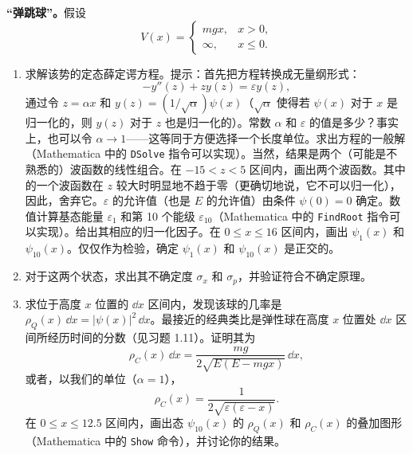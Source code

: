 \textbf{“弹跳球”。}假设
\[
V(x)=\begin{cases}mgx,&x>0,\\\infty,&x\leq0.\end{cases}
\]
\begin{enumerate}
\item 求解该势的定态薛定谔方程。提示：首先把方程转换成无量纲形式：
\[
-y''(z)+zy(z)=\varepsilon y(z),
\]
通过令 $z=\alpha x$ 和 $y(z)=(1/\sqrt{\alpha})\psi(x)$（$\sqrt{\alpha}$ 使得若 $\psi(x)$ 对于 $x$ 是归一化的，则 $y(z)$ 对于 $z$ 也是归一化的）。常数 $\alpha$ 和 $\varepsilon$ 的值是多少？事实上，也可以令 $\alpha\to1$——这等同于方便选择一个长度单位。求出方程的一般解（Mathematica 中的 \texttt{DSolve} 指令可以实现）。当然，结果是两个（可能是不熟悉的）波函数的线性组合。在 $-15<z<5$ 区间内，画出两个波函数。其中的一个波函数在 $z$ 较大时明显地不趋于零（更确切地说，它不可以归一化），因此，舍弃它。$\varepsilon$ 的允许值（也是 $E$ 的允许值）由条件 $\psi(0)=0$ 确定。数值计算基态能量 $\varepsilon_1$ 和第 10 个能级 $\varepsilon_{10}$（Mathematica 中的 \texttt{FindRoot} 指令可以实现）。给出其相应的归一化因子。在 $0\leq x\leq16$ 区间内，画出 $\psi_1(x)$ 和 $\psi_{10}(x)$。仅仅作为检验，确定 $\psi_1(x)$ 和 $\psi_{10}(x)$ 是正交的。
\item 对于这两个状态，求出其不确定度 $\sigma_x$ 和 $\sigma_p$，并验证符合不确定原理。
\item 求位于高度 $x$ 位置的 $\dd x$ 区间内，发现该球的几率是 $\rho_Q(x)\,\dd x=|\psi(x)|^2\,\dd x$。最接近的经典类比是弹性球在高度 $x$ 位置处 $\dd x$ 区间所经历时间的分数（见习题 1.11）。证明其为
\[
\rho_C(x)\,\dd x=\frac{mg}{2\sqrt{E(E-mgx)}}\,\dd x,
\]
或者，以我们的单位（$\alpha=1$），
\[
\rho_C(x)=\frac{1}{2\sqrt{\varepsilon(\varepsilon-x)}}.
\]
在 $0\leq x\leq12.5$ 区间内，画出态 $\psi_{10}(x)$ 的 $\rho_Q(x)$ 和 $\rho_C(x)$ 的叠加图形（Mathematica 中的 \texttt{Show} 命令），并讨论你的结果。
\end{enumerate}
\vfill

